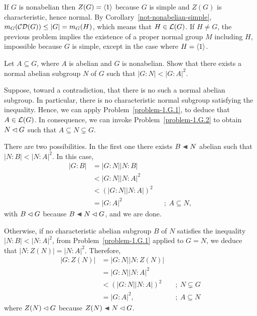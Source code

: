 \begin{solution} If $G$ is nonabelian then $Z(G)=\langle1\rangle$ because $G$ is simple and $Z(G)$ is characteristic, hence normal. By Corollary~\ref{not-nonabelian-simple}, $m_G(\operatorname{{\cal CD}}(G)) \le |G|=m_G(H)$, which means that $H\in{\cal L}(G)$. If $H\ne G$, the previous problem implies the existence of a proper normal group $M$ including $H$, impossible because $G$ is simple, except in the case where $H=\langle1\rangle$.  \end{solution}

\begin{probl}
    Let\/ $A \subseteq G$, where\/ $A$ is abelian and\/ $G$ is nonabelian. Show that there exists a normal abelian subgroup\/ $N$ of\/ $G$ such that\/ $|G:N|<|G:A|^2$.
\end{probl}

\begin{solution} Suppose, toward a contradiction, that there is no such a normal abelian subgroup. In particular, there is no characteristic normal subgroup satisfying the inequality. Hence, we can apply Problem~\ref{problem-1.G.1}, to deduce that $A\in{\cal L}(G)$. In consequence, we can invoke Problem~\ref{problem-1.G.2} to obtain $N\lhd G$ such that $A\subseteq N\varsubsetneq G$.

There are two possibilities. In the first one there exists $B\ch N$ abelian such that $|N:B|<|N:A|^2$. In this case,
\begin{align*}
    |G:B| &= |G:N||N:B|\\
        &< |G:N||N:A|^2\\
        &< (|G:N||N:A|)^2\\
        &= |G:A|^2  &&;\ A\subseteq N,
\end{align*}
with $B\lhd G$ because $B\ch N\normal G$, and we are done.

Otherwise, if no characteristic abelian subgroup $B$ of $N$ satisfies the inequality $|N:B|<|N:A|^2$, from Problem~\ref{problem-1.G.1} applied to $G=N$, we deduce that $|N:Z(N)|=|N:A|^2$. Therefore,
\begin{align*}
    |G:Z(N)|&=|G:N||N:Z(N)|\\
        &= |G:N||N:A|^2 \\
        &< (|G:N||N:A|)^2   &&;\ N\varsubsetneq G\\
        &= |G:A|^2,  &&;\ A\subseteq N
\end{align*}
where $Z(N)\lhd G$ because $Z(N)\ch N\normal G$.  \end{solution}
